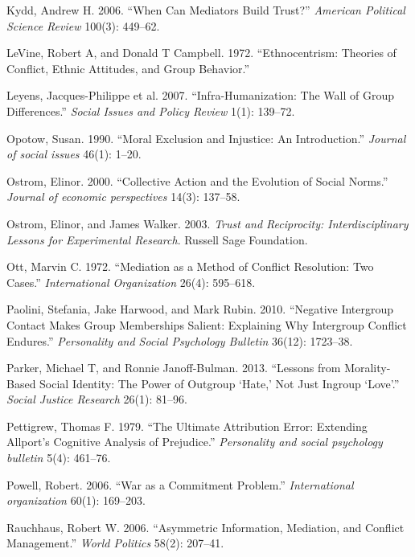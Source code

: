 \documentclass[11pt]{article}
\begin{document}
\hypertarget{ref-kydd2006can}{}
Kydd, Andrew H. 2006. ``When Can Mediators Build Trust?'' \emph{American
Political Science Review} 100(3): 449--62.

\hypertarget{ref-levine1972ethnocentrism}{}
LeVine, Robert A, and Donald T Campbell. 1972. ``Ethnocentrism: Theories
of Conflict, Ethnic Attitudes, and Group Behavior.''

\hypertarget{ref-leyens2007infra}{}
Leyens, Jacques-Philippe et al. 2007. ``Infra-Humanization: The Wall of
Group Differences.'' \emph{Social Issues and Policy Review} 1(1):
139--72.

\hypertarget{ref-opotow1990moral}{}
Opotow, Susan. 1990. ``Moral Exclusion and Injustice: An Introduction.''
\emph{Journal of social issues} 46(1): 1--20.

\hypertarget{ref-ostrom2000collective}{}
Ostrom, Elinor. 2000. ``Collective Action and the Evolution of Social
Norms.'' \emph{Journal of economic perspectives} 14(3): 137--58.

\hypertarget{ref-ostrom2003trust}{}
Ostrom, Elinor, and James Walker. 2003. \emph{Trust and Reciprocity:
Interdisciplinary Lessons for Experimental Research}. Russell Sage
Foundation.

\hypertarget{ref-ott1972mediation}{}
Ott, Marvin C. 1972. ``Mediation as a Method of Conflict Resolution: Two
Cases.'' \emph{International Organization} 26(4): 595--618.

\hypertarget{ref-paolini2010negative}{}
Paolini, Stefania, Jake Harwood, and Mark Rubin. 2010. ``Negative
Intergroup Contact Makes Group Memberships Salient: Explaining Why
Intergroup Conflict Endures.'' \emph{Personality and Social Psychology
Bulletin} 36(12): 1723--38.

\hypertarget{ref-parker2013lessons}{}
Parker, Michael T, and Ronnie Janoff-Bulman. 2013. ``Lessons from
Morality-Based Social Identity: The Power of Outgroup `Hate,' Not Just
Ingroup `Love'.'' \emph{Social Justice Research} 26(1): 81--96.

\hypertarget{ref-pettigrew1979ultimate}{}
Pettigrew, Thomas F. 1979. ``The Ultimate Attribution Error: Extending
Allport's Cognitive Analysis of Prejudice.'' \emph{Personality and
social psychology bulletin} 5(4): 461--76.

\hypertarget{ref-powell2006war}{}
Powell, Robert. 2006. ``War as a Commitment Problem.''
\emph{International organization} 60(1): 169--203.

\hypertarget{ref-rauchhaus2006mediation}{}
Rauchhaus, Robert W. 2006. ``Asymmetric Information, Mediation, and
Conflict Management.'' \emph{World Politics} 58(2): 207--41.
\end{document}
